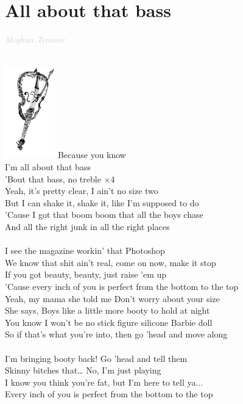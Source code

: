 \documentclass[a5paper, 10pt]{book}
\begin{document}
\section{All about that bass}\textcolor{lightgray}{\textit{Meghan Trainor}}\\
\begin{minipage}[t]{0.8\textwidth}
  ~\\ \includegraphics[height=4cm, angle=180, right]{images/all_about_that_bass_1.png}\vspace*{-4.3cm}
  \hspace*{5mm}Because you know\\
  \hspace*{5mm}I'm all about that bass\\
  \hspace*{5mm}'Bout that bass, no treble \hspace*{15mm}$\times$4\\

  Yeah, it's pretty clear, I ain't no size two\\
  But I can shake it, shake it, like I'm supposed to do\\
  'Cause I got that boom boom that all the boys chase\\
  And all the right junk in all the right places\\
  \\
  I see the magazine workin' that Photoshop\\
  We know that shit ain't real, come on now, make it stop\\
  If you got beauty, beauty, just raise 'em up\\
  'Cause every inch of you is perfect from the bottom to the top\\

  \hspace*{3mm}Yeah, my mama she told me Don't worry about your size\\
  \hspace*{3mm}She says, Boys like a little more booty to hold at night\\
  \hspace*{3mm}You know I won't be no stick figure silicone Barbie doll\\
  \hspace*{3mm}So if that's what you're into, then go 'head and move along\\
  \\
  I'm bringing booty back! Go 'head and tell them\\
  Skinny bitches that… No, I'm just playing\\
  I know you think you're fat, but I'm here to tell ya...\\
  Every inch of you is perfect from the bottom to the top\\
\end{minipage}
\end{document}
